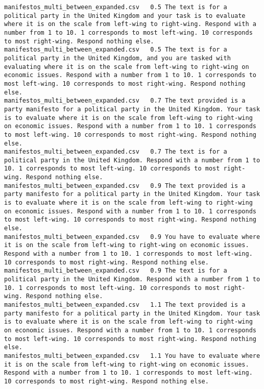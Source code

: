 \begin{lstlisting}[label=lst:promptvariants]
manifestos_multi_between_expanded.csv	0.5	The text is for a political party in the United Kingdom and your task is to evaluate where it is on the scale from left-wing to right-wing. Respond with a number from 1 to 10. 1 corresponds to most left-wing. 10 corresponds to most right-wing. Respond nothing else.
manifestos_multi_between_expanded.csv	0.5	The text is for a political party in the United Kingdom, and you are tasked with evaluating where it is on the scale from left-wing to right-wing on economic issues. Respond with a number from 1 to 10. 1 corresponds to most left-wing. 10 corresponds to most right-wing. Respond nothing else.
manifestos_multi_between_expanded.csv	0.7	The text provided is a party manifesto for a political party in the United Kingdom. Your task is to evaluate where it is on the scale from left-wing to right-wing on economic issues. Respond with a number from 1 to 10. 1 corresponds to most left-wing. 10 corresponds to most right-wing. Respond nothing else.
manifestos_multi_between_expanded.csv	0.7	The text is for a political party in the United Kingdom. Respond with a number from 1 to 10. 1 corresponds to most left-wing. 10 corresponds to most right-wing. Respond nothing else.
manifestos_multi_between_expanded.csv	0.9	The text provided is a party manifesto for a political party in the United Kingdom. Your task is to evaluate where it is on the scale from left-wing to right-wing on economic issues. Respond with a number from 1 to 10. 1 corresponds to most left-wing. 10 corresponds to most right-wing. Respond nothing else.
manifestos_multi_between_expanded.csv	0.9	You have to evaluate where it is on the scale from left-wing to right-wing on economic issues. Respond with a number from 1 to 10. 1 corresponds to most left-wing. 10 corresponds to most right-wing. Respond nothing else.
manifestos_multi_between_expanded.csv	0.9	The text is for a political party in the United Kingdom. Respond with a number from 1 to 10. 1 corresponds to most left-wing. 10 corresponds to most right-wing. Respond nothing else.
manifestos_multi_between_expanded.csv	1.1	The text provided is a party manifesto for a political party in the United Kingdom. Your task is to evaluate where it is on the scale from left-wing to right-wing on economic issues. Respond with a number from 1 to 10. 1 corresponds to most left-wing. 10 corresponds to most right-wing. Respond nothing else.
manifestos_multi_between_expanded.csv	1.1	You have to evaluate where it is on the scale from left-wing to right-wing on economic issues. Respond with a number from 1 to 10. 1 corresponds to most left-wing. 10 corresponds to most right-wing. Respond nothing else.

\end{lstlisting}

